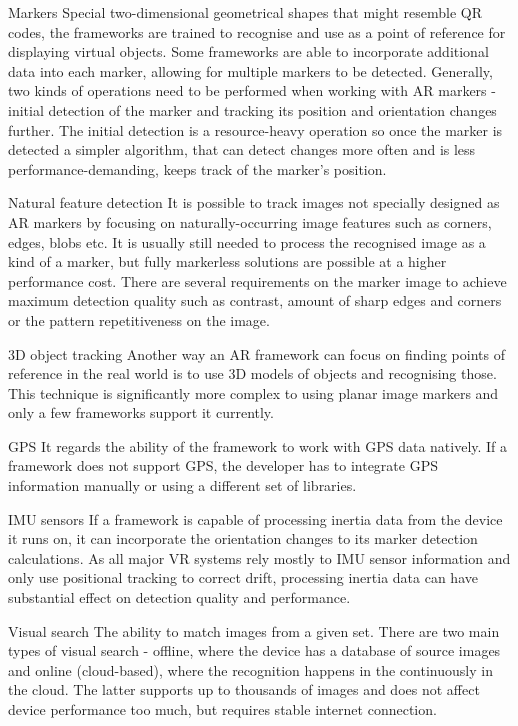 \documentclass[12pt, a4paper]{article}
\newenvironment{definitions}
{\begin{description}[style=nextline]}
{\end{description}}
\begin{document}
\begin{definitions}
\item[Markers] Special two-dimensional geometrical shapes that might resemble QR codes, the frameworks are trained to recognise and use as a point of reference for displaying virtual objects. Some frameworks are able to incorporate additional data into each marker, allowing for multiple markers to be detected. Generally, two kinds of operations need to be performed when working with AR markers - initial detection of the marker and tracking its position and orientation changes further. The initial detection is a resource-heavy operation so once the marker is detected a simpler algorithm, that can detect changes more often and is less performance-demanding, keeps track of the marker’s position.
\item[Natural feature detection] It is possible to track images not specially designed as AR markers by focusing on naturally-occurring image features such as corners, edges, blobs etc. It is usually still needed to process the recognised image as a kind of a marker, but fully markerless solutions are possible at a higher performance cost. There are several requirements on the marker image to achieve maximum detection quality such as contrast, amount of sharp edges and corners or the pattern repetitiveness on the image.
\item[3D object tracking] Another way an AR framework can focus on finding points of reference in the real world is to use 3D models of objects and recognising those. This technique is significantly more complex to using planar image markers and only a few frameworks support it currently.
\item[GPS] It regards the ability of the framework to work with GPS data natively. If a framework does not support GPS, the developer has to integrate GPS information manually or using a different set of libraries.
\item[IMU sensors] If a framework is capable of processing inertia data from the device it runs on, it can incorporate the orientation changes to its marker detection calculations. As all major VR systems rely mostly to IMU sensor information and only use positional tracking to correct drift, processing inertia data can have substantial effect on detection quality and performance.
\item[Visual search] The ability to match images from a given set. There are two main types of visual search - offline, where the device has a database of source images and online (cloud-based), where the recognition happens in the continuously in the cloud. The latter supports up to thousands of images and does not affect device performance too much, but requires stable internet connection.

\end{definitions}
\end{document}
